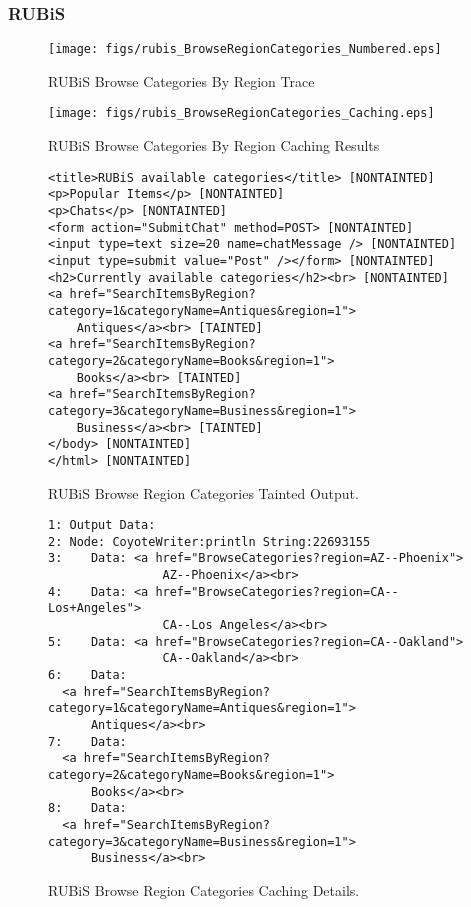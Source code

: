\documentclass[msc,oneside]{ubcthesis}
\begin{document}
\subsubsection{RUBiS}

\begin{sidewaysfigure}
\centering
\scalebox{0.43}
{\texttt{[image: figs/rubis\_BrowseRegionCategories\_Numbered.eps]}}
\caption{RUBiS Browse Categories By Region Trace} 
\label{fig:browseregioncategories}
\end{sidewaysfigure}

\begin{sidewaysfigure}
\centering
\scalebox{0.41}
{\texttt{[image: figs/rubis\_BrowseRegionCategories\_Caching.eps]}}
\caption{RUBiS Browse Categories By Region Caching Results} 
\label{fig:browseregioncategoriescaching}
\end{sidewaysfigure}

\begin{figure}[ht]
  \caption{\label{fig:browseregioncategoriesto} RUBiS Browse Region Categories Tainted Output.}
\begin{verbatim}
<title>RUBiS available categories</title> [NONTAINTED]
<p>Popular Items</p> [NONTAINTED]
<p>Chats</p> [NONTAINTED]
<form action="SubmitChat" method=POST> [NONTAINTED]
<input type=text size=20 name=chatMessage /> [NONTAINTED]
<input type=submit value="Post" /></form> [NONTAINTED]
<h2>Currently available categories</h2><br> [NONTAINTED]
<a href="SearchItemsByRegion?category=1&categoryName=Antiques&region=1">
    Antiques</a><br> [TAINTED]
<a href="SearchItemsByRegion?category=2&categoryName=Books&region=1">
    Books</a><br> [TAINTED]
<a href="SearchItemsByRegion?category=3&categoryName=Business&region=1">
    Business</a><br> [TAINTED]
</body> [NONTAINTED]
</html> [NONTAINTED]
\end{verbatim}
\end{figure}

\begin{figure}[ht]
  \caption{\label{fig:browseregioncategoriescd} RUBiS Browse Region Categories Caching Details.}
\begin{verbatim}
1: Output Data:
2: Node: CoyoteWriter:println String:22693155
3:    Data: <a href="BrowseCategories?region=AZ--Phoenix">
                AZ--Phoenix</a><br>
4:    Data: <a href="BrowseCategories?region=CA--Los+Angeles">
                CA--Los Angeles</a><br>
5:    Data: <a href="BrowseCategories?region=CA--Oakland">
                CA--Oakland</a><br>
6:    Data: 
  <a href="SearchItemsByRegion?category=1&categoryName=Antiques&region=1">
      Antiques</a><br>
7:    Data: 
  <a href="SearchItemsByRegion?category=2&categoryName=Books&region=1">
      Books</a><br>
8:    Data: 
  <a href="SearchItemsByRegion?category=3&categoryName=Business&region=1">
      Business</a><br>
\end{verbatim}
\end{figure}
\end{document}
